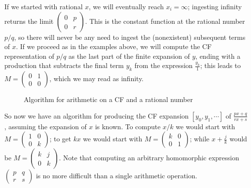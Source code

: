 \documentclass[11pt, oneside]{amsart}   	%
\newcommand{\pqrs}{\left(
\begin{smallmatrix} 
p & q\\ 
r & s 
\end{smallmatrix}
\right)}
\renewcommand{\:}{\negthickspace:\negthickspace}
\begin{document}
If we started with rational $x$, we will eventually reach $x_i = \infty$; ingesting infinity returns the limit ${\left(
\begin{smallmatrix} 
0 & p\\ 
0 & r
\end{smallmatrix}
\right)}$.
This is the constant function at the rational number $p/q$, so there will never be any need to ingest the (nonexistent) subsequent 
terms of $x$. If we proceed as in the examples above, we will compute the CF representation of $p/q$ as the last part of the finite
expansion of $y$, ending with a production that subtracts the final term $y_k$ from the expression $\frac{y_k}{1}$; this leads to
$M=\left(\begin{smallmatrix}0 & 1 \\ 0 & 0\end{smallmatrix}\right)$, which we may read as infinity.

\begin{figure}\label{fig:oneCFarith}
\begin{algorithmic}
 
 
\STATE{$M \gets \pqrs$} 
           \ENDWHILE
\ENDWHILE
\end{algorithmic}
\caption{Algorithm for arithmetic on a CF and a rational number}
\end{figure}

So now we have an algorithm for producing the CF expansion $[y_0,y_1,\cdots]$ of $\frac{px+q}{rx+s}$,
assuming the expansion of $x$ is known.
To compute $x/k$ we would start with $M=\left(
\begin{smallmatrix} 
1 & 0\\ 
0 & k 
\end{smallmatrix}
\right)$; 
to get $kx$ we would start with $M=\left(
\begin{smallmatrix} 
k & 0\\ 
0 & 1 
\end{smallmatrix}
\right)$; while $x+\frac{j}{k}$ would be $M=\left(
\begin{smallmatrix} 
k & j\\ 
0 & k 
\end{smallmatrix}
\right)$. Note that computing an arbitrary homomorphic expression $\pqrs$ is no more difficult than a single arithmetic operation.
\end{document}

